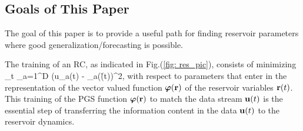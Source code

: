 \documentclass[12pt]{article}
\begin{document}
\subsection{Goals of This Paper}

The goal of this paper is to provide a useful path for finding reservoir parameters where good generalization/forecasting is possible.




The training of an RC, as indicated in Fig.(\ref{fig: res_pic}), consists of minimizing
\be
\sum_t \sum_{a=1}^D (u_a(t) - \varphi_a(\r(t))^2,
\label{rctrain}
\ee 
with respect to parameters that enter in the representation of the vector valued function $\mbox{$\boldsymbol{\varphi}$}(\mbox{{\bf r}})$ of the reservoir variables $\mbox{{\bf r}}(t)$. This training of the PGS function $\mbox{$\boldsymbol{\varphi}$}(\mbox{{\bf r}})$ to match the data stream $\mbox{$\bf{u}$}(t)$ is the essential step of transferring the information content in the data $\mbox{$\bf{u}$}(t)$ to the reservoir dynamics. 
\end{document}
